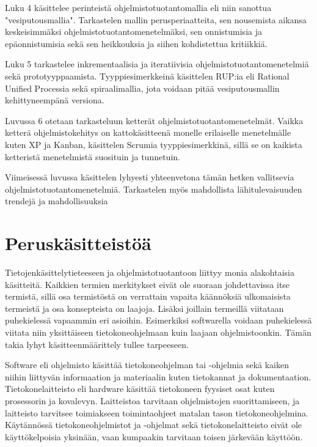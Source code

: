 \documentclass[finnish,12pt]{tktltiki2}
\theoremstyle{definition}
\theoremstyle{remark}
\begin{document}
Luku 4 käsittelee perinteistä ohjelmistotuotantomallia eli niin sanottua "vesiputousmallia". Tarkastelen mallin perusperiaatteita, sen nousemista aikansa keskeisimmäksi ohjelmistotuotantomenetelmäksi, sen onnistumisia ja epäonnistumisia sekä sen heikkouksia ja siihen kohdistettua kritiikkiä.

Luku 5 tarkastelee inkrementaalisia ja iteratiivisia ohjelmistotuotantomenetelmiä sekä prototyyppaamista. Tyyppiesimerkkeinä käsittelen RUP:ia eli Rational Unified Processia sekä spiraalimallia, jota voidaan pitää vesiputousmallin kehittyneempänä versiona.

Luvussa 6 otetaan tarkasteluun ketterät ohjelmistotuotantomenetelmät. Vaikka ketterä ohjelmistokehitys on kattokäsitteenä monelle erilaiselle menetelmälle kuten XP ja Kanban, käsittelen Scrumia tyyppiesimerkkinä, sillä se on kaikista ketteristä menetelmistä suosituin ja tunnetuin.

Viimeisessä luvussa käsittelen lyhyesti yhteenvetona tämän hetken vallitsevia ohjelmistotuotantomenetelmiä. Tarkastelen myös mahdollista lähitulevaisuuden trendejä ja mahdollisuuksia

\section{Peruskäsitteistöä}
Tietojenkäsittelytieteeseen ja ohjelmistotuotantoon liittyy monia alakohtaisia käsitteitä. Kaikkien termien merkitykset eivät ole suoraan johdettavissa itse termistä, sillä osa termistöstä on verrattain vapaita käännöksiä ulkomaisista termeistä ja osa konsepteista on laajoja. Lisäksi joillain termeillä viitataan puhekielessä  vapaammin eri asioihin. Esimerkiksi softwarella voidaan puhekielessä viitata niin yksittäiseen tietokoneohjelmaan kuin laajaan ohjelmistoonkin. Tämän takia lyhyt käsitteenmäärittely tullee tarpeeseen.

Software eli ohjelmisto käsittää tietokoneohjelman tai -ohjelmia sekä kaiken niihin liittyvän informaation ja materiaalin kuten tietokannat ja dokumentaation. \newline Tietokonelaitteisto eli hardware käsittää tietokoneen fyysiset osat kuten prosessorin ja kovalevyn. Laitteistoa tarvitaan ohjelmistojen suorittamiseen, ja laitteisto tarvitsee toimiakseen toimintaohjeet matalan tason tietokoneohjelmina. Käytännössä tietokoneohjelmistot ja -ohjelmat sekä tietokonelaitteisto eivät ole käyttökelpoisia yksinään, vaan kumpaakin tarvitaan toisen järkevään käyttöön.
\end{document}
